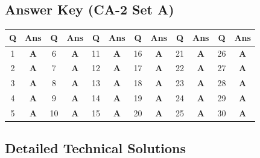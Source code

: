 \subsection*{Answer Key (CA-2 Set A)}

\begin{center}
\begin{tabular}{|c|c||c|c||c|c||c|c||c|c||c|c|}
\hline
\textbf{Q} & \textbf{Ans} & \textbf{Q} & \textbf{Ans} & \textbf{Q} & \textbf{Ans} & \textbf{Q} & \textbf{Ans} & \textbf{Q} & \textbf{Ans} & \textbf{Q} & \textbf{Ans} \\
\hline
1 & \textbf{A} & 6 & \textbf{A} & 11 & \textbf{A} & 16 & \textbf{A} & 21 & \textbf{A} & 26 & \textbf{A} \\
2 & \textbf{A} & 7 & \textbf{A} & 12 & \textbf{A} & 17 & \textbf{A} & 22 & \textbf{A} & 27 & \textbf{A} \\
3 & \textbf{A} & 8 & \textbf{A} & 13 & \textbf{A} & 18 & \textbf{A} & 23 & \textbf{A} & 28 & \textbf{A} \\
4 & \textbf{A} & 9 & \textbf{A} & 14 & \textbf{A} & 19 & \textbf{A} & 24 & \textbf{A} & 29 & \textbf{A} \\
5 & \textbf{A} & 10 & \textbf{A} & 15 & \textbf{A} & 20 & \textbf{A} & 25 & \textbf{A} & 30 & \textbf{A} \\
\hline
\end{tabular}
\end{center}

\vspace{3mm}
\subsection*{Detailed Technical Solutions}

